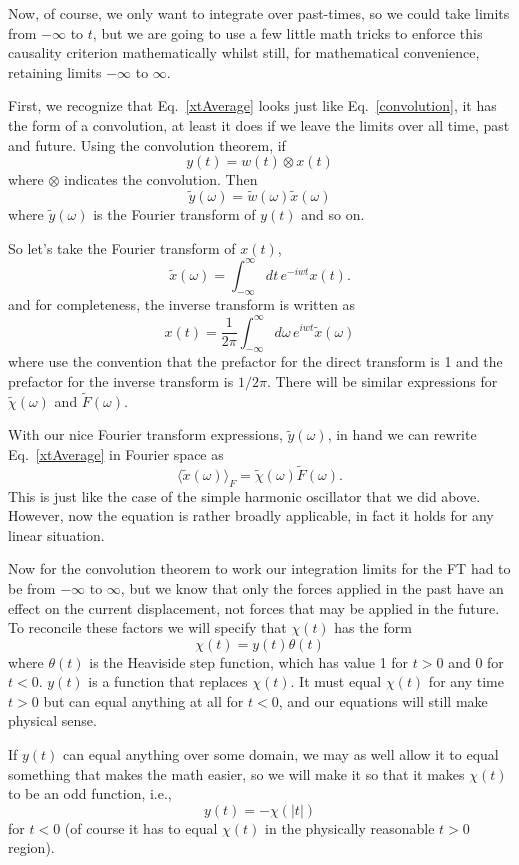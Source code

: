 \documentclass[]{revtex4}
\newcommand{\sm}[1]{{\[#1\]}}
\begin{document}
Now, of course, we only want to integrate over past-times, so we could take limits from $-\infty$ to $t$,
but we are going to use a few little math tricks to enforce this causality criterion mathematically whilst still,
for mathematical convenience, retaining limits $-\infty$ to $\infty$.

First, we recognize that Eq.~\ref{xtAverage} looks just like Eq.~\ref{convolution}, it has the form of a convolution,
at least it does if we leave the limits over all time,
past and future.  Using the convolution theorem, if
\sm{y(t) = w(t)\otimes x(t) }
where $\otimes$ indicates the convolution.  Then
\sm{\tilde{y}(\omega)=\tilde{w}{(\omega)}\tilde{x}(\omega)}
where $\tilde{y}(\omega)$ is the Fourier transform of $y(t)$ and so on.

So let's take the Fourier transform of $x(t)$,
\sm{\tilde{x}(\omega) = \int_{-\infty}^{\infty}dt\,e^{-iwt}x(t).}
and for completeness, the inverse transform is written as
\sm{{x}(t) = \frac{1}{2\pi}\int_{-\infty}^{\infty}d\omega\,e^{iwt}\tilde{x}(\omega)}
where use the convention that the prefactor for the direct transform is 1 and the prefactor for the
inverse transform is $1/2\pi$.
There will be similar expressions for $\tilde{\chi}(\omega)$ and $\tilde{F}(\omega)$.

With our nice Fourier transform expressions, $\tilde{y}(\omega)$, in hand we can rewrite Eq.~\ref{xtAverage} in Fourier
space as
\sm{\langle \tilde{x}(\omega)\rangle_F = \tilde{\chi}(\omega)\tilde{F}(\omega).}
This is just like the case of the simple harmonic oscillator that we did above. However, now the equation is rather
broadly applicable, in fact it holds for any linear situation.

Now for the convolution theorem to work our integration limits for the FT had to be from $-\infty$ to $\infty$, but we know
that only the forces applied in the past have an effect on the current displacement, not forces that may be applied in the future.
To reconcile these factors we will specify that
$\chi(t)$ has the form
\sm{\chi(t) = y(t)\theta(t)\label{chit}}
where $\theta(t)$ is the Heaviside step function, which has value 1 for $t>0$ and 0 for $t<0$. $y(t)$ is a function that replaces
$\chi (t)$.  It must equal $\chi(t)$ for any time $t>0$ but
can equal anything at all for $t<0$, and our equations will still make physical sense.

If $y(t)$ can equal anything over some domain, we may as well allow it to equal something that makes the math easier, so we
will make it so that it makes $\chi(t)$ to be an odd function, i.e.,
\sm{y(t) = -\chi (|t|)}
for $t<0$
(of course it has to equal ${\chi}(t)$ in the physically reasonable $t>0$ region).
\end{document}
